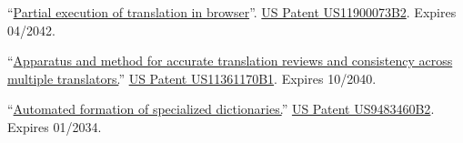 
``\href{https://patents.google.com/patent/US20230070302A1}{Partial execution of translation in browser}''. \hypersetup{urlcolor=black}\href{https://patents.google.com/patent/US20230070302A1}{US Patent US11900073B2}\hypersetup{urlcolor=linkcol}. Expires 04/2042.%

``\href{https://patents.google.com/patent/US11361170B1}{Apparatus and method for accurate translation reviews and consistency across multiple translators.}'' \hypersetup{urlcolor=black}\href{https://patents.google.com/patent/US11361170B1}{US Patent US11361170B1}\hypersetup{urlcolor=linkcol}. Expires 10/2040. %

``\href{https://patents.google.com/patent/US9483460B2}{Automated formation of specialized dictionaries.}'' \hypersetup{urlcolor=black}\href{https://patents.google.com/patent/US9483460B2}{US Patent US9483460B2}\hypersetup{urlcolor=linkcol}. Expires 01/2034.\\ %

